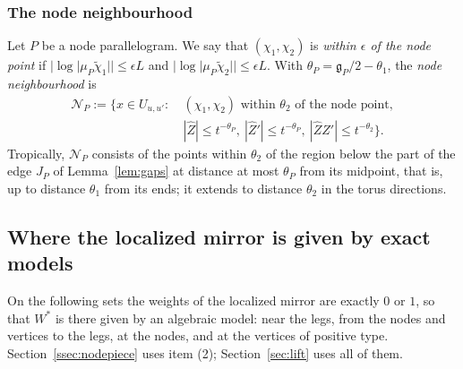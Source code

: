 \subsubsection*{The node neighbourhood}
Let $P$ be a node parallelogram. We say that $(\chi_1,\chi_2)$ is \emph{within $\epsilon$ of the node point} if
$|\log|\mu_P\tilde\chi_1||\le\epsilon L$ and $|\log|\mu_P\tilde\chi_2||\le\epsilon L$. With $\theta_P=\mathfrak g_P/2-\theta_1$, the
\emph{node neighbourhood} is
\[
\begin{aligned}\mathcal N_P:=\bigl\{x\in U_{u,u'}:\ &(\chi_1,\chi_2)\text{ within }\theta_2\text{ of the node point},\\
&|\hat Z|\le t^{-\theta_P},\ |\hat Z'|\le t^{-\theta_P},\ |\hat Z\hat Z'|\le t^{-\theta_2}\bigr\}.\end{aligned}
\]
Tropically, $\mathcal N_P$ consists of the points within $\theta_2$ of the region below the part of the edge $J_P$ of
Lemma~\ref{lem:gaps} at distance at most $\theta_P$ from its midpoint, that is, up to distance $\theta_1$ from its ends; it
extends to distance $\theta_2$ in the torus directions.

\subsection{Where the localized mirror is given by exact models}\label{ssec:windows}

On the following sets the weights of the localized mirror are exactly $0$ or $1$, so that $W^*$ is there given by an
algebraic model: near the legs, from the nodes and vertices to the legs, at the nodes, and at the vertices of positive
type. Section~\ref{ssec:nodepiece} uses item (2); Section~\ref{sec:lift} uses all of them.

